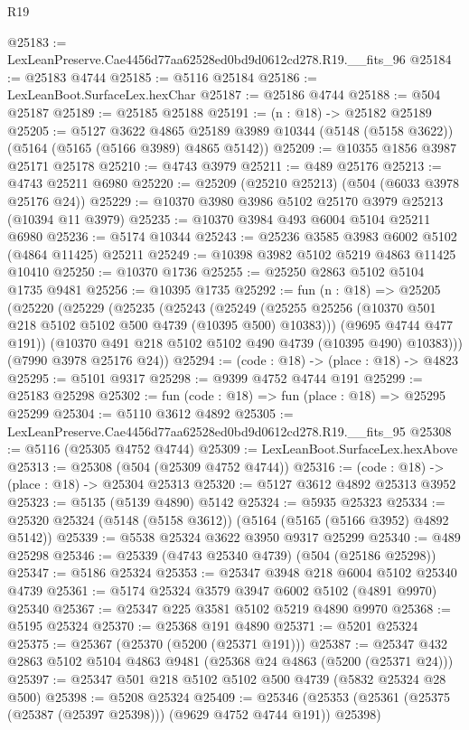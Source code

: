 \begin{lexlean}{R19}
\begin{coremodule}
{{{{{{{{{{{@25183 := LexLeanPreserve.Cae4456d77aa62528ed0bd9d0612cd278.R19.__fits_96
@25184 := @25183 @4744
@25185 := @5116 @25184
@25186 := LexLeanBoot.SurfaceLex.hexChar
@25187 := @25186 @4744
@25188 := @504 @25187
@25189 := @25185 @25188
@25191 := (n : @18) -> @25182 @25189
@25205 := @5127
    @3622
    @4865
    @25189
    @3989
    @10344
    (@5148 (@5158 @3622))
    (@5164 (@5165 (@5166 @3989) @4865 @5142))
@25209 := @10355 @1856 @3987 @25171 @25178
@25210 := @4743 @3979
@25211 := @489 @25176
@25213 := @4743 @25211 @6980
@25220 := @25209 (@25210 @25213) (@504 (@6033 @3978 @25176 @24))
@25229 := @10370 @3980 @3986 @5102 @25170 @3979 @25213 (@10394 @11 @3979)
@25235 := @10370 @3984 @493 @6004 @5104 @25211 @6980
@25236 := @5174 @10344
@25243 := @25236 @3585 @3983 @6002 @5102 (@4864 @11425) @25211
@25249 := @10398 @3982 @5102 @5219 @4863 @11425 @10410
@25250 := @10370 @1736
@25255 := @25250 @2863 @5102 @5104 @1735 @9481
@25256 := @10395 @1735
@25292 := fun (n : @18) =>
  @25205
    (@25220
      (@25229
        (@25235
          (@25243
            (@25249 (@25255 @25256 (@10370 @501 @218 @5102 @5102 @500 @4739 (@10395 @500) @10383)))
            (@9695 @4744 @477 @191))
          (@10370 @491 @218 @5102 @5102 @490 @4739 (@10395 @490) @10383)))
      (@7990 @3978 @25176 @24))
@25294 := (code : @18) -> (place : @18) -> @4823
@25295 := @5101 @9317
@25298 := @9399 @4752 @4744 @191
@25299 := @25183 @25298
@25302 := fun (code : @18) => fun (place : @18) => @25295 @25299
@25304 := @5110 @3612 @4892
@25305 := LexLeanPreserve.Cae4456d77aa62528ed0bd9d0612cd278.R19.__fits_95
@25308 := @5116 (@25305 @4752 @4744)
@25309 := LexLeanBoot.SurfaceLex.hexAbove
@25313 := @25308 (@504 (@25309 @4752 @4744))
@25316 := (code : @18) -> (place : @18) -> @25304 @25313
@25320 := @5127 @3612 @4892 @25313 @3952
@25323 := @5135 (@5139 @4890) @5142
@25324 := @5935 @25323
@25334 := @25320 @25324 (@5148 (@5158 @3612)) (@5164 (@5165 (@5166 @3952) @4892 @5142))
@25339 := @5538 @25324 @3622 @3950 @9317 @25299
@25340 := @489 @25298
@25346 := @25339 (@4743 @25340 @4739) (@504 (@25186 @25298))
@25347 := @5186 @25324
@25353 := @25347 @3948 @218 @6004 @5102 @25340 @4739
@25361 := @5174 @25324 @3579 @3947 @6002 @5102 (@4891 @9970) @25340
@25367 := @25347 @225 @3581 @5102 @5219 @4890 @9970
@25368 := @5195 @25324
@25370 := @25368 @191 @4890
@25371 := @5201 @25324
@25375 := @25367 (@25370 (@5200 (@25371 @191)))
@25387 := @25347 @432 @2863 @5102 @5104 @4863 @9481 (@25368 @24 @4863 (@5200 (@25371 @24)))
@25397 := @25347 @501 @218 @5102 @5102 @500 @4739 (@5832 @25324 @28 @500)
@25398 := @5208 @25324
@25409 := @25346 (@25353 (@25361 (@25375 (@25387 (@25397 @25398))) (@9629 @4752 @4744 @191)) @25398)
}}}}}}}}}}}
\end{coremodule}
\end{lexlean}
